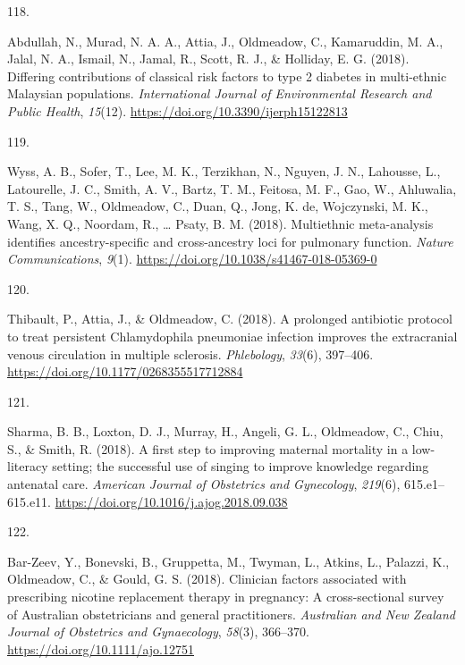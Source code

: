 \documentclass[11pt, a4paper]{awesome-cv}
\newlength{\csllabelwidth}
\newcommand{\CSLLeftMargin}[1]{\parbox[t]{\csllabelwidth}{#1}}
\newcommand{\CSLRightInline}[1]{\parbox[t]{\linewidth - \csllabelwidth}{#1}}
\begin{document}
\leavevmode\hypertarget{ref-abdullah_differing_2018}{}%
\CSLLeftMargin{118. }
\CSLRightInline{Abdullah, N., Murad, N. A. A., Attia, J., Oldmeadow, C.,
Kamaruddin, M. A., Jalal, N. A., Ismail, N., Jamal, R., Scott, R. J., \&
Holliday, E. G. (2018). Differing contributions of classical risk
factors to type 2 diabetes in multi-ethnic Malaysian populations.
\emph{International Journal of Environmental Research and Public
Health}, \emph{15}(12). \url{https://doi.org/10.3390/ijerph15122813}}

\leavevmode\hypertarget{ref-wyss_multiethnic_2018}{}%
\CSLLeftMargin{119. }
\CSLRightInline{Wyss, A. B., Sofer, T., Lee, M. K., Terzikhan, N.,
Nguyen, J. N., Lahousse, L., Latourelle, J. C., Smith, A. V., Bartz, T.
M., Feitosa, M. F., Gao, W., Ahluwalia, T. S., Tang, W., Oldmeadow, C.,
Duan, Q., Jong, K. de, Wojczynski, M. K., Wang, X. Q., Noordam, R.,
\ldots{} Psaty, B. M. (2018). Multiethnic meta-analysis identifies
ancestry-specific and cross-ancestry loci for pulmonary function.
\emph{Nature Communications}, \emph{9}(1).
\url{https://doi.org/10.1038/s41467-018-05369-0}}

\leavevmode\hypertarget{ref-thibault_prolonged_2018}{}%
\CSLLeftMargin{120. }
\CSLRightInline{Thibault, P., Attia, J., \& Oldmeadow, C. (2018). A
prolonged antibiotic protocol to treat persistent Chlamydophila
pneumoniae infection improves the extracranial venous circulation in
multiple sclerosis. \emph{Phlebology}, \emph{33}(6), 397--406.
\url{https://doi.org/10.1177/0268355517712884}}

\leavevmode\hypertarget{ref-sharma_first_2018}{}%
\CSLLeftMargin{121. }
\CSLRightInline{Sharma, B. B., Loxton, D. J., Murray, H., Angeli, G. L.,
Oldmeadow, C., Chiu, S., \& Smith, R. (2018). A first step to improving
maternal mortality in a low-literacy setting; the successful use of
singing to improve knowledge regarding antenatal care. \emph{American
Journal of Obstetrics and Gynecology}, \emph{219}(6), 615.e1--615.e11.
\url{https://doi.org/10.1016/j.ajog.2018.09.038}}

\leavevmode\hypertarget{ref-bar-zeev_clinician_2018}{}%
\CSLLeftMargin{122. }
\CSLRightInline{Bar-Zeev, Y., Bonevski, B., Gruppetta, M., Twyman, L.,
Atkins, L., Palazzi, K., Oldmeadow, C., \& Gould, G. S. (2018).
Clinician factors associated with prescribing nicotine replacement
therapy in pregnancy: A cross-sectional survey of Australian
obstetricians and general practitioners. \emph{Australian and New
Zealand Journal of Obstetrics and Gynaecology}, \emph{58}(3), 366--370.
\url{https://doi.org/10.1111/ajo.12751}}
\end{document}

